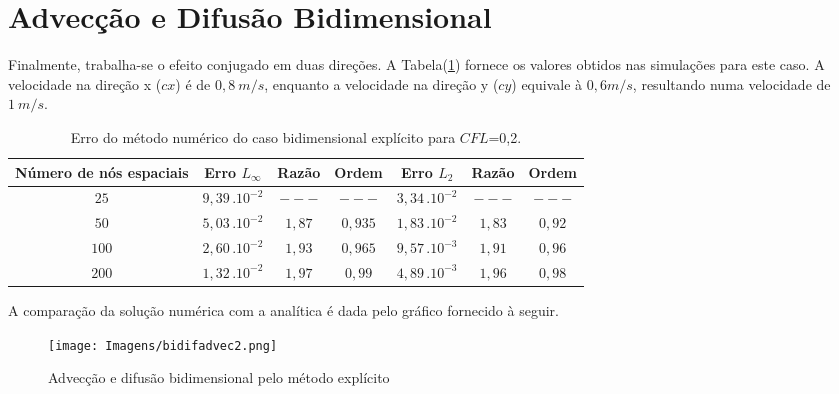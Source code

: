 \section{Advecção e Difusão Bidimensional}
\noindent

	Finalmente, trabalha-se o efeito conjugado em duas direções. A Tabela(\ref{tabela8}) fornece os valores obtidos nas simulações para este caso. A velocidade na direção x ($cx$) é de $0,8 \ m/s$, enquanto a velocidade na direção y ($cy$) equivale à $0,6 m/s$, resultando numa velocidade de $1 \ m/s$.
	
	\begin{table}[h!]
	\caption{Erro do método numérico do caso bidimensional explícito para $CFL$=0,2.}
	\label{tabela8}
	\centering
	\begin{tabular}{c | c c c | c c c}
		\hline
		Número de nós  espaciais&       Erro $L_\infty$       	& Razão   	 & Ordem   & Erro $L_{2}$ 				& Razão 	  & Ordem  \\ \hline
		$25$ 					&		$9,39 \, . 10^{-2}$     & $---$      & $---$   &       $3,34 \, . 10^{-2}$  & $---$       & $---$    \\ 
		$50$ 					&       $5,03 \, . 10^{-2}$     & $1,87$     & $0,935$  &       $1,83 \, . 10^{-2}$  & $1,83$      & $0,92$    \\ 
		$100$ 					&       $2,60 \, . 10^{-2}$     & $1,93$     & $0,965$  &       $9,57 \, . 10^{-3}$  & $1,91$      & $0,96$    \\ 
		$200$ 					&       $1,32 \, . 10^{-2}$     & $1,97$     & $0,99$  &       $4,89 \, . 10^{-3}$  & $1,96$      & $0,98$    \\ \hline

	\end{tabular}
\end{table}	

A comparação da solução numérica com a analítica é dada pelo gráfico fornecido à seguir.
	
\begin{figure}[ht!]
	\label{bidifadvec}
	\centering
	\texttt{[image: Imagens/bidifadvec2.png]}
	\caption{Advecção e difusão bidimensional pelo método explícito}
\end{figure}